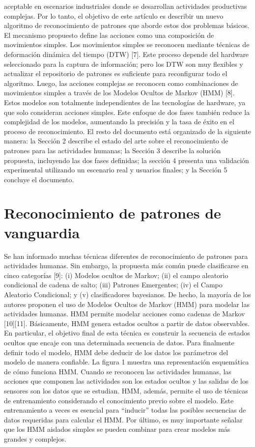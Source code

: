 \documentclass[10pt]{article}
\begin{document}
aceptable en escenarios industriales donde se desarrollan actividades productivas complejas. Por lo tanto, el objetivo de este artículo es describir un nuevo algoritmo de reconocimiento de patrones que aborde estos dos problemas básicos. El mecanismo propuesto define las acciones como una composición de movimientos simples. Los movimientos simples se reconocen mediante técnicas de deformación dinámica del tiempo (DTW) [7]. Este proceso depende del hardware seleccionado para la captura de información; pero los DTW son muy flexibles y actualizar el repositorio de patrones es suficiente para reconfigurar todo el algoritmo. Luego, las acciones complejas se reconocen como combinaciones de movimientos simples a través de los Modelos Ocultos de Markov (HMM) [8]. Estos modelos son totalmente independientes de las tecnologías de hardware, ya que solo consideran acciones simples. Este enfoque de dos fases también reduce la complejidad de los modelos, aumentando la precisión y la tasa de éxito en el proceso de reconocimiento. El resto del documento está organizado de la siguiente manera: la Sección 2 describe el estado del arte sobre el reconocimiento de patrones para las actividades humanas; la Sección 3 describe la solución propuesta, incluyendo las dos fases definidas; la sección 4 presenta una validación experimental utilizando un escenario real y usuarios finales; y la Sección 5 concluye el documento. 


\section{Reconocimiento de patrones de vanguardia }

Se han informado muchas técnicas diferentes de reconocimiento de patrones para actividades humanas. Sin embargo, la propuesta más común puede clasificarse en cinco categorías [9]: (i) Modelos ocultos de Markov; (ii) el campo aleatorio condicional de cadena de salto; (iii) Patrones Emergentes; (iv) el Campo Aleatorio Condicional; y (v) clasificadores bayesianos. De hecho, la mayoría de los autores proponen el uso de Modelos Ocultos de Markov (HMM) para modelar las actividades humanas. HMM permite modelar acciones como cadenas de Markov [10][11]. Básicamente, HMM genera estados ocultos a partir de datos observables. En particular, el objetivo final de esta técnica es construir la secuencia de estados ocultos que encaje con una determinada secuencia de datos. Para finalmente definir todo el modelo, HMM debe deducir de los datos los parámetros del modelo de manera confiable. La figura 1 muestra una representación esquemática de cómo funciona HMM. Cuando se reconocen las actividades humanas, las acciones que componen las actividades son los estados ocultos y las salidas de los sensores son los datos que se estudian. HMM, además, permite el uso de técnicas de entrenamiento considerando el conocimiento previo sobre el modelo. Este entrenamiento a veces es esencial para “inducir” todas las posibles secuencias de datos requeridas para calcular el HMM. Por último, es muy importante señalar que los HMM aislados simples se pueden combinar para crear modelos más grandes y complejos.
\end{document}
